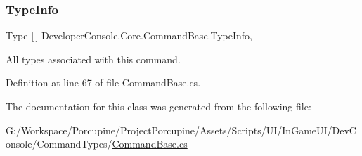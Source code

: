 \subsubsection{\texorpdfstring{Type\+Info}{TypeInfo}}
{\footnotesize\ttfamily Type \mbox{[}$\,$\mbox{]} Developer\+Console.\+Core.\+Command\+Base.\+Type\+Info\hspace{0.3cm}{\ttfamily [get]}, {}}



All types associated with this command. 



Definition at line 67 of file Command\+Base.\+cs.



The documentation for this class was generated from the following file\+:\begin{DoxyCompactItemize}
\item 
G\+:/\+Workspace/\+Porcupine/\+Project\+Porcupine/\+Assets/\+Scripts/\+U\+I/\+In\+Game\+U\+I/\+Dev\+Console/\+Command\+Types/\hyperlink{_command_base_8cs}{Command\+Base.\+cs}\end{DoxyCompactItemize}
